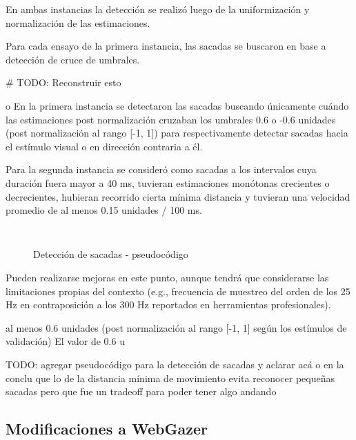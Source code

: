 En ambas instancias la detección se realizó luego de la uniformización y
normalización de las estimaciones.

Para cada ensayo de la primera instancia, las sacadas se buscaron en base a
detección de cruce de umbrales.

# TODO: Reconstruir esto

o
En la primera instancia se detectaron las sacadas buscando únicamente cuándo
las estimaciones post normalización cruzaban los umbrales 0.6 o -0.6 unidades
(post normalización al rango [-1, 1]) para respectivamente detectar sacadas
hacia el estímulo visual o en dirección contraria a él.



Para la segunda instancia se consideró como sacadas a los intervalos cuya
duración fuera mayor a 40 ms, tuvieran estimaciones monótonas crecientes o
decrecientes, hubieran recorrido cierta mínima distancia y tuvieran una
velocidad promedio de al menos 0.15 unidades / 100 ms.

\begin{figure}
  \begin{verbatim}
  
  \end{verbatim}

  \caption{Detección de sacadas - pseudocódigo}
\end{figure}


Pueden realizarse mejoras en este punto, aunque tendrá que considerarse las
limitaciones propias del contexto (e.g., frecuencia de muestreo del orden de
los 25 Hz en contraposición a los 300 Hz reportados en herramientas
profesionales).

al menos 0.6 unidades (post normalización al
rango [-1, 1] según los estímulos de validación)
El valor de 0.6 u

TODO: agregar pseudocódigo para la detección de sacadas y aclarar acá o en la
      conclu que lo de la distancia mínima de movimiento evita reconocer
      pequeñas sacadas pero que fue un tradeoff para poder tener algo andando

\subsection{Modificaciones a WebGazer}

